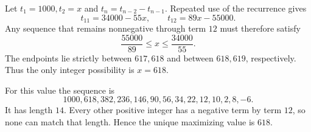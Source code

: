 Let $t_1=1000,t_2=x$ and $t_n=t_{n-2}-t_{n-1}$. Repeated use of the recurrence gives
\[
t_{11}=34000-55x,\qquad t_{12}=89x-55000.
\]
Any sequence that remains nonnegative through term $12$ must therefore satisfy
\[
\dfrac{55000}{89}\le x\le\dfrac{34000}{55}.
\]
The endpoints lie strictly between $617,618$ and between $618,619$, respectively. Thus the only integer possibility is $x=618$.

For this value the sequence is
\[
1000,618,382,236,146,90,56,34,22,12,10,2,8,-6.
\]
It has length $14$. Every other positive integer has a negative term by term $12$, so none can match that length. Hence the unique maximizing value is $\boxed{618}$.
